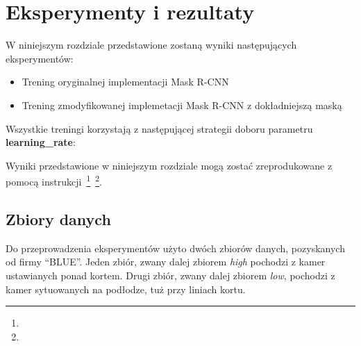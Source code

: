 \chapter{Eksperymenty i rezultaty}

W niniejszym rozdziale przedstawione zostaną wyniki następujących eksperymentów:

\begin{itemize}
 \item Trening oryginalnej implementacji Mask R-CNN
 \item Trening zmodyfikowanej implemetacji Mask R-CNN z dokładniejszą maską
\end{itemize}

Wszystkie treningi korzystają z następującej strategii doboru parametru \textbf{learning\_rate}:


Wyniki przedstawione w niniejszym rozdziale mogą zostać zreprodukowane z pomocą instrukcji~\footnote{}~\footnote{}.

\section{Zbiory danych}

Do przeprowadzenia eksperymentów użyto dwóch zbiorów danych, pozyskanych od firmy ``BLUE''. Jeden zbiór, zwany dalej zbiorem \textit{high} pochodzi z kamer ustawianych ponad kortem. Drugi zbiór, zwany dalej zbiorem \textit{low}, pochodzi z kamer sytuowanych na podłodze, tuż przy liniach kortu.

